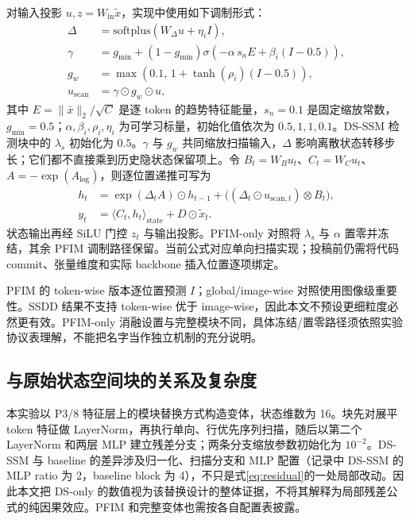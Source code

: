 \documentclass[UTF8,12pt,a4paper]{ctexart}
\begin{document}
对输入投影 $u,z=W_{\mathrm{in}}\tilde{x}$，实现中使用如下调制形式：
\begin{align}
\Delta &= \mathrm{softplus}\!\left(W_{\Delta}u+\eta_i I\right),\\
\gamma &= g_{\min}+(1-g_{\min})
\sigma\!\left(-\alpha\,s_n E+\beta_i(I-0.5)\right),\\
g_w &= \max\!\left(0.1,\,1+\tanh(\rho_i)(I-0.5)\right),\\
u_{\mathrm{scan}}&=\gamma\odot g_w\odot u,
\label{eq:modulation}
\end{align}
其中 $E=\|\bar{x}\|_2/\sqrt{C}$ 是逐 token 的趋势特征能量，$s_n=0.1$ 是固定缩放常数，$g_{\min}=0.5$；$\alpha,\beta_i,\rho_i,\eta_i$ 为可学习标量，初始化值依次为 $0.5,1,1,0.1$。DS-SSM 检测块中的 $\lambda_s$ 初始化为 $0.5$。$\gamma$ 与 $g_w$ 共同缩放扫描输入，$\Delta$ 影响离散状态转移步长；它们都不直接乘到历史隐状态保留项上。令 $B_t=W_Bu_t$、$C_t=W_Cu_t$、$A=-\exp(A_{\log})$，则逐位置递推可写为
\begin{equation}
\begin{aligned}
h_t&=\exp(\Delta_t A)\odot h_{t-1}
+\bigl((\Delta_t\odot u_{\mathrm{scan},t})\otimes B_t\bigr),\\
y_t&=\langle C_t,h_t\rangle_{\mathrm{state}}+D\odot\tilde{x}_t .
\end{aligned}
\end{equation}
状态输出再经 SiLU 门控 $z_t$ 与输出投影。PFIM-only 对照将 $\lambda_s$ 与 $\alpha$ 置零并冻结，其余 PFIM 调制路径保留。当前公式对应单向扫描实现；投稿前仍需将代码 commit、张量维度和实际 backbone 插入位置逐项绑定。

PFIM 的 token-wise 版本逐位置预测 $I$；global/image-wise 对照使用图像级重要性。SSDD 结果不支持 token-wise 优于 image-wise，因此本文不预设更细粒度必然更有效。PFIM-only 消融设置与完整模块不同，具体冻结/置零路径须依照实验协议表理解，不能把名字当作独立机制的充分说明。

\subsection{与原始状态空间块的关系及复杂度}
本实验以 P3/8 特征层上的模块替换方式构造变体，状态维数为 16。块先对展平 token 特征做 LayerNorm，再执行单向、行优先序列扫描，随后以第二个 LayerNorm 和两层 MLP 建立残差分支；两条分支缩放参数初始化为 $10^{-2}$。DS-SSM 与 baseline 的差异涉及归一化、扫描分支和 MLP 配置（记录中 DS-SSM 的 MLP ratio 为 2，baseline block 为 4），不只是式\ref{eq:residual}的一处局部改动。因此本文把 DS-only 的数值视为该替换设计的整体证据，不将其解释为局部残差公式的纯因果效应。PFIM 和完整变体也需按各自配置表披露。
\end{document}
